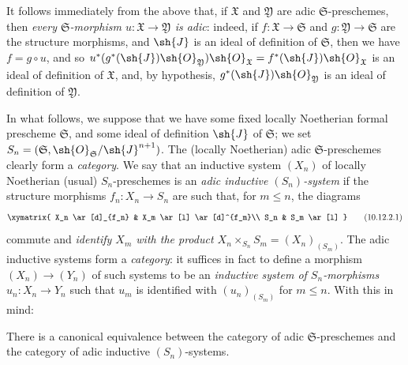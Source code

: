 It follows immediately from the above that, if $\mathfrak{X}$ and $\mathfrak{Y}$ are adic $\mathfrak{S}$-preschemes, then \emph{every $\mathfrak{S}$-morphism $u:\mathfrak{X}\to\mathfrak{Y}$ is adic}:
indeed, if $f:\mathfrak{X}\to\mathfrak{S}$ and $g:\mathfrak{Y}\to\mathfrak{S}$ are the structure morphisms, and $\sh{J}$ is an ideal of definition of $\mathfrak{S}$, then we have $f=g\circ u$, and so $u^*(g^*(\sh{J})\sh{O}_\mathfrak{Y})\sh{O}_\mathfrak{X}=f^*(\sh{J})\sh{O}_\mathfrak{X}$ is an ideal of definition of $\mathfrak{X}$, and, by hypothesis, $g^*(\sh{J})\sh{O}_\mathfrak{Y}$ is an ideal of definition of $\mathfrak{Y}$.

\begin{env}[10.12.2]
\label{I.10.12.2}
In what follows, we suppose that we have some fixed locally Noetherian formal prescheme $\mathfrak{S}$, and some ideal of definition $\sh{J}$ of $\mathfrak{S}$;
we set $S_n=(\mathfrak{S},\sh{O}_\mathfrak{S}/\sh{J}^{n+1})$.
The (locally Noetherian) adic $\mathfrak{S}$-preschemes clearly form a \emph{category}.
We say that an inductive system $(X_n)$ of locally Noetherian (usual) $S_n$-preschemes is an \emph{adic inductive $(S_n)$-system} if the structure morphisms $f_n:X_n\to S_n$ are such that, for $m\leq n$, the diagrams
\[
\label{I.10.12.2.1}
  \xymatrix{
    X_n \ar[d]_{f_n}
    & X_m \ar[l] \ar[d]^{f_m}\\
    S_n
    & S_m \ar[l]
  }
  \tag{10.12.2.1}
\]
commute and \emph{identify $X_m$ with the product $X_n\times_{S_n}S_m=(X_n)_{(S_m)}$}.
The adic inductive systems form a \emph{category}:
it suffices in fact to define a morphism $(X_n)\to(Y_n)$ of such systems to be an \emph{inductive system of $S_n$-morphisms $u_n:X_n\to Y_n$} such that $u_m$ is identified with $(u_n)_{(S_m)}$ for $m\leq n$.
With this in mind:
\end{env}

\begin{theorem}[10.12.3]
\label{I.10.12.3}
There is a canonical equivalence between the category of adic $\mathfrak{S}$-preschemes and the category of adic inductive $(S_n)$-systems.
\end{theorem}

